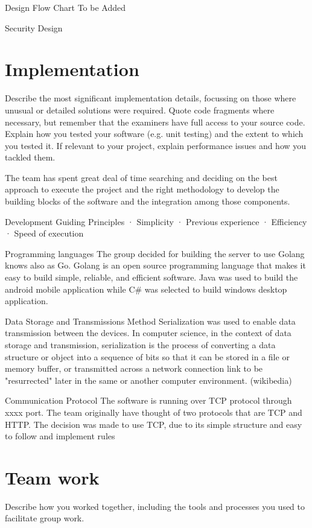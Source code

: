 \documentclass{article}
\begin{document}
Design Flow Chart
To be Added

Security Design


\section{Implementation}
Describe the most significant implementation details, focussing on those where unusual or detailed solutions were required. Quote code fragments where necessary, but remember that the examiners have full access to your source code. Explain how you tested your software (e.g. unit testing) and the extent to which you tested it. If relevant to your project, explain performance issues and how you tackled them.

The team has spent great deal of time searching and deciding on the best approach to execute the project and the right methodology to develop the building blocks of the software and the integration among those components.

Development Guiding Principles
·       Simplicity
·       Previous experience
·       Efficiency
·       Speed of execution

Programming languages
The group decided for building the server to use Golang knows also as Go. Golang  is an open source programming language that makes it easy to build simple, reliable, and efficient software.
Java was used to build the android mobile application while C# was selected to build windows desktop application.

Data Storage and Transmissions Method
Serialization was used to enable data transmission between the devices. In computer science, in the context of data storage and transmission, serialization is the process of converting a data structure or object into a sequence of bits so that it can be stored in a file or memory buffer, or transmitted across a network connection link to be "resurrected" later in the same or another computer environment. (wikibedia)

Communication Protocol
The software is running over TCP protocol through xxxx port. The team originally have thought of two protocols that are TCP and HTTP. The decision was made to use TCP, due to its simple structure and easy to follow and implement rules


\section{Team work}
Describe how you worked together, including the tools and processes you used to facilitate group work.
\end{document}
